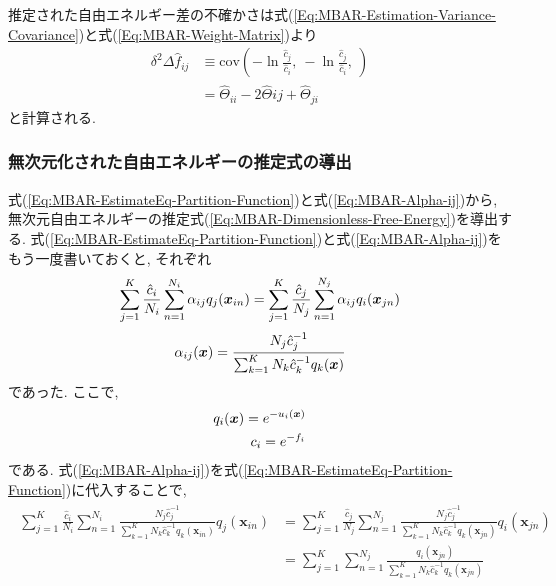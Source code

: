 推定された自由エネルギー差の不確かさは式(\ref{Eq:MBAR-Estimation-Variance-Covariance})と式(\ref{Eq:MBAR-Weight-Matrix})より
\begin{align}
    \delta^{2} \Delta \hat{f}_{ij}
    &\equiv
    \mathrm{cov}
    \left(
        - \ln \frac{\hat{c}_{j}}{\hat{c}_{i}},~
        - \ln \frac{\hat{c}_{j}}{\hat{c}_{i}},~
    \right)
    \\ &=
    \hat{\Theta}_{ii} - 2\hat{\Theta}{ij} + \hat{\Theta}_{ji}
\end{align}
と計算される. 

\subsubsection{無次元化された自由エネルギーの推定式の導出}
式(\ref{Eq:MBAR-EstimateEq-Partition-Function})と式(\ref{Eq:MBAR-Alpha-ij})から, 無次元自由エネルギーの推定式(\ref{Eq:MBAR-Dimensionless-Free-Energy})を導出する. 
式(\ref{Eq:MBAR-EstimateEq-Partition-Function})と式(\ref{Eq:MBAR-Alpha-ij})をもう一度書いておくと, それぞれ
\begin{equation}
    \sum_{j=1}^{K} \frac{\hat{c}_{i}}{N_{i}}
    \sum_{n=1}^{N_{i}} \alpha_{ij} q_{j}(\bm{x}_{in}) =
    \sum_{j=1}^{K} \frac{\hat{c}_{j}}{N_{j}}
    \sum_{n=1}^{N_{j}} \alpha_{ij} q_{i}(\bm{x}_{jn})
    \notag
\end{equation}
\begin{equation}
    \alpha_{ij}(\bm{x}) =
    \frac{N_{j}\hat{c}_{j}^{-1}}{\sum_{k=1}^{K}N_{k}\hat{c}_{k}^{-1}q_{k}(\bm{x})}
    \notag
\end{equation}
であった. ここで, 
\begin{align}
    q_{i}(\bm{x}) = e^{-u_{i}(\bm{x})}
    \\ \notag
    c_{i} = e^{-f_{i}}
    \notag
\end{align}
である. 
式(\ref{Eq:MBAR-Alpha-ij})を式(\ref{Eq:MBAR-EstimateEq-Partition-Function})に代入することで, 
\begin{align}
\begin{split}
    \sum_{j=1}^{K}
    \frac{\hat{c}_{i}}{N_{i}}
    \sum_{n=1}^{N_{i}}
    \frac{N_{j}\hat{c}_{j}^{-1}}{\sum_{k=1}^{K} N_{k} \hat{c}_{k}^{-1} q_{k}(\bm{x}_{in})}
    q_{j}(\bm{x}_{in})
    &=
    \sum_{j=1}^{K}
    \frac{\hat{c}_{j}}{N_{j}}
    \sum_{n=1}^{N_{j}}
    \frac{N_{j}\hat{c}_{j}^{-1}}{\sum_{k=1}^{K} N_{k} \hat{c}_{k}^{-1} q_{k}(\bm{x}_{jn})}
    q_{i}(\bm{x}_{jn})
    \\
    &=
    \sum_{j=1}^{K}
    \sum_{n=1}^{N_{j}}
    \frac{q_{i}(\bm{x}_{jn})}{\sum_{k=1}^{K} N_{k} \hat{c}_{k}^{-1} q_{k}(\bm{x}_{jn})}
\end{split}
\end{align}
